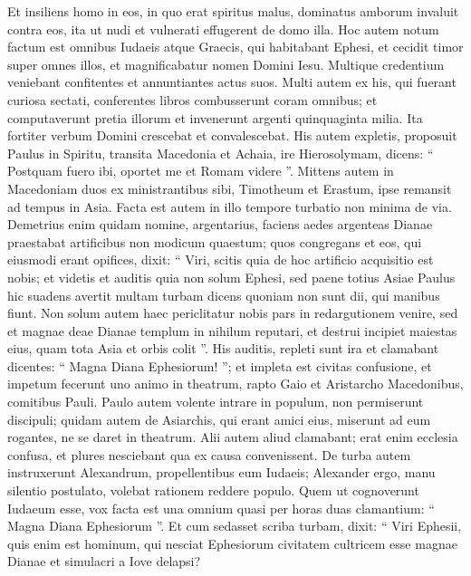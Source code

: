 \begin{biblechapter}
\begin{biblechapter}
\begin{biblechapter}
\begin{biblechapter}
\begin{biblechapter}
\begin{biblechapter}
\begin{biblechapter}
\begin{biblechapter}
\begin{biblechapter}
\begin{biblechapter}
\begin{biblechapter}
\begin{biblechapter}
\begin{biblechapter}
\begin{biblechapter}
\begin{biblechapter}
\begin{biblechapter}
\begin{biblechapter}
\begin{biblechapter}
\begin{biblechapter}
 \verse Et insiliens homo in eos, in quo erat spiritus malus, dominatus amborum invaluit contra eos, ita ut nudi et vulnerati effugerent de domo illa. 
\verse Hoc autem notum factum est omnibus Iudaeis atque Graecis, qui habitabant Ephesi, et cecidit timor super omnes illos, et magnificabatur nomen Domini Iesu. 
\verse Multique credentium veniebant confitentes et annuntiantes actus suos. 
\verse Multi autem ex his, qui fuerant curiosa sectati, conferentes libros combusserunt coram omnibus; et computaverunt pretia illorum et invenerunt argenti quinquaginta milia. 
\verse Ita fortiter verbum Domini crescebat et convalescebat.
 \verse His autem expletis, proposuit Paulus in Spiritu, transita Macedonia et Achaia, ire Hierosolymam, dicens: “ Postquam fuero ibi, oportet me et Romam videre ”. 
\verse Mittens autem in Macedoniam duos ex ministrantibus sibi, Timotheum et Erastum, ipse remansit ad tempus in Asia.
 \verse Facta est autem in illo tempore turbatio non minima de via. 
\verse Demetrius enim quidam nomine, argentarius, faciens aedes argenteas Dianae praestabat artificibus non modicum quaestum; 
\verse quos congregans et eos, qui eiusmodi erant opifices, dixit: “ Viri, scitis quia de hoc artificio acquisitio est nobis; 
\verse et videtis et auditis quia non solum Ephesi, sed paene totius Asiae Paulus hic suadens avertit multam turbam dicens quoniam non sunt dii, qui manibus fiunt. 
\verse Non solum autem haec periclitatur nobis pars in redargutionem venire, sed et magnae deae Dianae templum in nihilum reputari, et destrui incipiet maiestas eius, quam tota Asia et orbis colit ”.
 \verse His auditis, repleti sunt ira et clamabant dicentes: “ Magna Diana Ephesiorum! ”; 
\verse et impleta est civitas confusione, et impetum fecerunt uno animo in theatrum, rapto Gaio et Aristarcho Macedonibus, comitibus Pauli. 
\verse Paulo autem volente intrare in populum, non permiserunt discipuli; 
\verse quidam autem de Asiarchis, qui erant amici eius, miserunt ad eum rogantes, ne se daret in theatrum. 
\verse Alii autem aliud clamabant; erat enim ecclesia confusa, et plures nesciebant qua ex causa convenissent.
 \verse De turba autem instruxerunt Alexandrum, propellentibus eum Iudaeis; Alexander ergo, manu silentio postulato, volebat rationem reddere populo. 
\verse Quem ut cognoverunt Iudaeum esse, vox facta est una omnium quasi per horas duas clamantium: “ Magna Diana Ephesiorum ”. 
\verse Et cum sedasset scriba turbam, dixit: “ Viri Ephesii, quis enim est hominum, qui nesciat Ephesiorum civitatem cultricem esse magnae Dianae et simulacri a Iove delapsi? 

\end{biblechapter}
\end{biblechapter}
\end{biblechapter}
\end{biblechapter}
\end{biblechapter}
\end{biblechapter}
\end{biblechapter}
\end{biblechapter}
\end{biblechapter}
\end{biblechapter}
\end{biblechapter}
\end{biblechapter}
\end{biblechapter}
\end{biblechapter}
\end{biblechapter}
\end{biblechapter}
\end{biblechapter}
\end{biblechapter}
\end{biblechapter}

